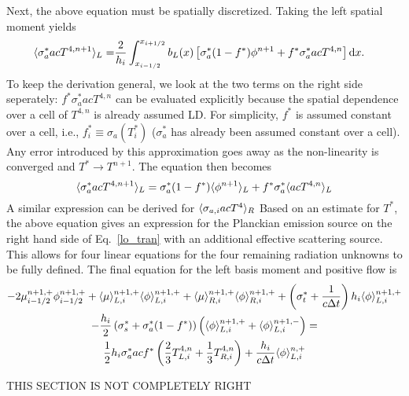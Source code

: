 Next, the above equation must be spatially discretized.  Taking the
left spatial moment yields
\begin{align}\label{temp_moms}
    \langle \sigma_a^* a c T^{4,n+1} \rangle_L =& \frac{2}{h_i} \int_{x_{{i-1/2}}} ^{x_{{i+1/2}}}
    b_L(x) \left[ \sigma_a^*(1-f^*)\phi^{n+1} + f^* \sigma_a^* a c T^{4,n}\right] \mathrm{d} x.
\end{align}
To keep the derivation general, we look at the two terms on the right side
seperately: $f^* \sigma_a^* a c T^{4,n}$ can be evaluated explicitly because the spatial
dependence over a cell of $T^{4,n}$ is already assumed LD. 
For simplicity, $f^*$ is assumed constant over a cell, i.e., $f^*_i \equiv \sigma_a(T_i^*)$
($\sigma_a^*$ has already been
assumed constant over a cell). Any error introduced by this approximation goes away as the
non-linearity is converged and $T^*\rightarrow T^{n+1}$.  The equation then becomes
\begin{equation}\label{temp_const}
    \langle \sigma_a^* a c T^{4,n+1} \rangle_L = \sigma^*_{a}(1-f^*)\langle \phi^{n+1} \rangle_L +
    f^*
    \sigma^*_{a} \langle  a c T^{4,n} \rangle_L
\end{equation}
A similar expression can be derived for $\langle \sigma_{a,i} a c T^4 \rangle_R$
Based on an estimate for $T^*$, the above equation gives an expression for
the Planckian emission source on the right hand side
of Eq.~\eqref{lo_tran} with an additional effective scattering source.
This allows for four linear equations for the four remaining radiation unknowns to be fully
defined.  The final equation for the left basis moment and positive flow is
\begin{multline}\label{lo_trans_fin}
    -2{\mu}_{i-1/2}^{n+1,+} \phi_{i-1/2}^{n+1,+} + \langle \mu \rangle_{L,i}^{n+1,+}
  \langle \phi \rangle_{L,i}^{n+1,+}
  +  \langle \mu \rangle_{R,i}^{n+1,+}
  \langle \phi \rangle_{R,i}^{n+1,+} +  \left(\sigma_t^*+\frac{1}{c \Delta t} \right) h_i 
  \langle \phi \rangle_{L,i}^{n+1,+} \\- \frac{h_i}{2}\left(\sigma_s^* + \sigma_a^*(1-f^*)\right)
  \left( \langle \phi \rangle_{L,i}^{n+1,+} +
  \langle \phi \rangle_{L,i}^{n+1,-}\right) = \\ \frac{1}{2} h_i \sigma_a^*a c f^* \left(\frac{2}{3} T_{L,i}^{4,n} +
  \frac{1}{3} T_{R,i}^{4,n} \right) + 
  \frac{h_i}{c\Delta t}\langle \phi \rangle_{L,i}^{n,+}
\end{multline}

THIS SECTION IS NOT COMPLETELY RIGHT

